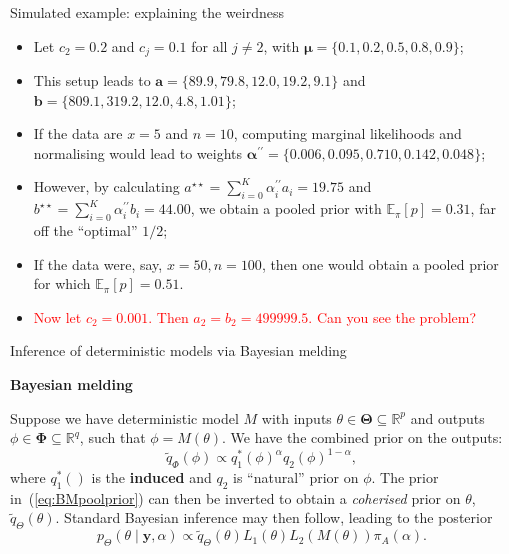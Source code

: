 \begin{frame}{Simulated example: explaining the weirdness}
\begin{itemize}
 \item Let $c_2 = 0.2$ and $c_j = 0.1$ for all $j \neq 2$, with $\boldsymbol\mu = \{0.1, 0.2, \mathbf{0.5}, 0.8, 0.9\}$;\pause
 \item This setup leads to $\boldsymbol a = \{ 89.9, 79.8, \mathbf{12.0}, 19.2, 9.1\}$ and $\boldsymbol b = \{809.1, 319.2, \mathbf{12.0}, 4.8, 1.01\} $;\pause
 \item If the data are $x = 5$ and $n = 10$, computing marginal likelihoods and normalising would lead to weights $\boldsymbol\alpha^{\prime\prime} = \{0.006, 0.095, \mathbf{0.710}, 0.142, 0.048\}$;\pause
 \item However, by calculating $a^{\star\star} = \sum_{i = 0}^K \alpha_i^{\prime\prime} a_i = 19.75$ and $b^{\star\star} =  \sum_{i = 0}^K \alpha_i^{\prime\prime} b_i = 44.00$, we obtain a pooled prior with $\mathbb{E}_\pi [p] =  0.31$, far off the ``optimal'' $1/2$;\pause
 \item If the data were, say, $x = 50, n = 100$, then one would obtain a pooled prior for which $\mathbb{E}_\pi [p] = 0.51$.\pause
 \item [\textcolor{red}{\textbullet}] \textcolor{red}{ Now let $c_2 = 0.001$. Then $a_2 = b_2 = 499999.5$. Can you see the problem?}
\end{itemize}
\end{frame}
\begin{frame}{Inference of deterministic models via Bayesian melding}
\begin{center}
\textbf{Bayesian melding} 
\end{center}
Suppose we have deterministic model $M$ with inputs $\theta \in \boldsymbol\Theta \subseteq \mathbb{R}^p$ and outputs $\phi \in \boldsymbol\Phi\subseteq \mathbb{R}^q$, such that $\phi = M(\theta)$.
We have the combined prior on the outputs:
\begin{equation}
 \label{eq:BMpoolprior}
 \tilde{q}_{\Phi}(\phi) \propto q_1^\ast(\phi)^\alpha q_2(\phi)^{1-\alpha},
\end{equation}
where $q_1^\ast()$ is the \textbf{induced} and $q_2$ is ``natural'' prior on $\phi$.
The prior in~(\ref{eq:BMpoolprior}) can then be inverted to obtain a \textit{coherised} prior on $\theta$, $\tilde{q}_{\Theta}(\theta)$.
Standard Bayesian inference may then follow,  leading to the posterior
\begin{equation}
 \label{eq:BMpoolposterior}
 p_{\Theta}(\theta \mid \boldsymbol y, \alpha) \propto \tilde{q}_{\Theta}(\theta) L_1(\theta) L_2(M(\theta))\pi_A(\alpha).
\end{equation}
\end{frame}

